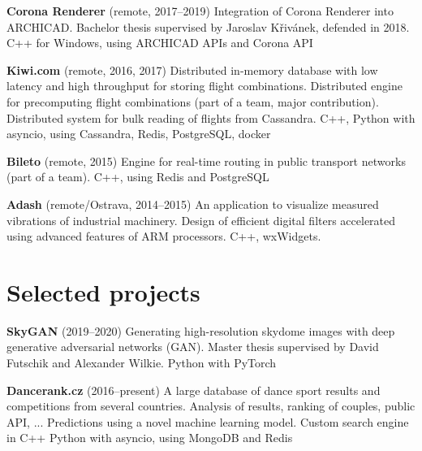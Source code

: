\documentclass[10pt,a4paper]{article}
\begin{document}
\begin{multicols}{2}
\textbf{Corona Renderer} (remote, 2017–2019)
  \newline Integration of Corona Renderer into ARCHICAD.
  \newline Bachelor thesis supervised by Jaroslav Křivánek, defended in 2018.
  \newline C++ for Windows, using ARCHICAD APIs and Corona API

\textbf{Kiwi.com} (remote, 2016, 2017)
  \newline Distributed in-memory database with low latency and high throughput
    for storing flight combinations.
  \newline Distributed engine for precomputing flight combinations (part of a
    team, major contribution).
  \newline Distributed system for bulk reading of flights from Cassandra.
  \newline C++, Python with asyncio, using Cassandra, Redis, PostgreSQL,
    docker

\textbf{Bileto} (remote, 2015)
  \newline Engine for real-time routing in public transport networks (part of a
  team).
  \newline C++, using Redis and PostgreSQL

\columnbreak

\textbf{Adash} (remote/Ostrava, 2014–2015)
  \newline An application to visualize measured vibrations of industrial
  machinery.
  \newline Design of efficient digital filters accelerated using advanced
  features of ARM processors.
  \newline C++, wxWidgets.


\section*{Selected projects}

\textbf{SkyGAN} (2019–2020)
  \newline Generating high-resolution skydome images with deep generative
  adversarial networks (GAN).
  \newline Master thesis supervised by David Futschik and Alexander Wilkie.
  \newline Python with PyTorch

\textbf{Dancerank.cz} (2016–present)
  \newline A large database of dance sport results and competitions from several
  countries.
  \newline Analysis of results, ranking of couples, public API, ...
  \newline Predictions using a novel machine learning model.
  \newline Custom search engine in C++
  \newline Python with asyncio, using MongoDB and Redis


\end{multicols}
\end{document}

